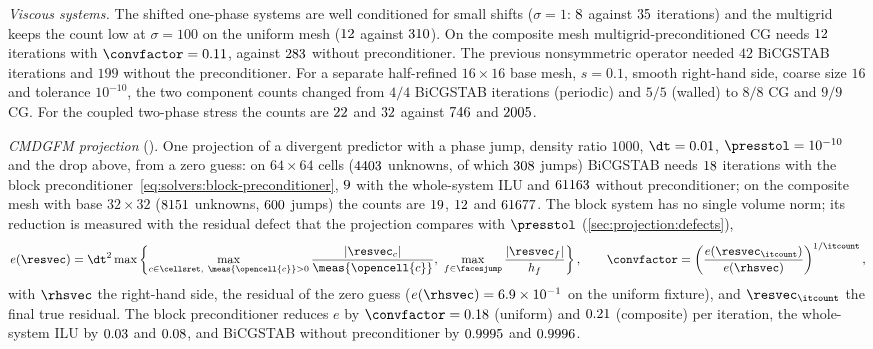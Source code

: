 \emph{Viscous systems.} The shifted one-phase systems are well conditioned for
small shifts ($\sigma=1$: $8$ against
$35$ iterations) and the multigrid keeps the count low at
$\sigma=100$ on the uniform mesh ($12$ against
$310$). On the composite mesh multigrid-preconditioned CG needs
$12$ iterations with $\convfactor=\chkSolvShiftAmrFactor$,
against $283$ without preconditioner. The previous
nonsymmetric operator needed $42$ BiCGSTAB iterations and $199$ without the
preconditioner. For a separate half-refined $16\times16$ base mesh, $s=0.1$,
smooth right-hand side, coarse size $16$ and tolerance $10^{-10}$, the two
component counts changed from $4/4$ BiCGSTAB iterations (periodic) and $5/5$
(walled) to $8/8$ CG and $9/9$ CG. For the coupled two-phase stress the counts are
$22$ and $32$ against
$746$ and $2005$.

\emph{CMDGFM projection} (). One projection of a
divergent predictor with a phase jump, density ratio $1000$, $\dt=0.01$,
$\presstol=10^{-10}$ and the drop above, from a zero guess: on $64\times64$
cells ($4403$ unknowns, of which
$308$ jumps) BiCGSTAB needs $18$
iterations with the block preconditioner~\cref{eq:solvers:block-preconditioner},
$9$ with the whole-system ILU and $61163$
without preconditioner; on the composite mesh with base $32\times32$
($8151$ unknowns, $600$ jumps) the counts
are $19$, $12$ and $61677$.
The block system has no single
volume norm; its reduction is measured with the residual defect that the
projection compares with $\presstol$ (\cref{sec:projection:defects}),
\begin{equation}\label{eq:solvers:cmdgfm-defect}
  e(\resvec)=\dt^2\max\curlypar{\max_{c\in\cellsret,\ \meas{\opencell{c}}>0}\frac{\abs{\resvec_c}}{\meas{\opencell{c}}},\ \max_{f\in\facesjump}\frac{\abs{\resvec_f}}{h_f}},
  \qquad
  \convfactor=\roundpar{\frac{e(\resvec_{\itcount})}{e(\rhsvec)}}^{1/\itcount},
\end{equation}
with $\rhsvec$ the right-hand side, the residual of the zero guess
($e(\rhsvec)=\chkSolvCmdUniformInitial$ on the uniform fixture), and
$\resvec_{\itcount}$ the final true residual. The block preconditioner reduces
$e$ by $\convfactor=\chkSolvCmdUniformFactor$ (uniform) and
$0.21$ (composite) per iteration, the whole-system ILU by
$0.03$ and $0.08$, and BiCGSTAB
without preconditioner by $0.9995$ and
$0.9996$.

